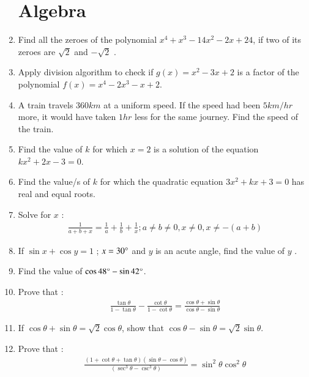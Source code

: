 \documentclass[2pt,-letter paper]{article}
\providecommand{\brak}[1]{\ensuremath{\left(#1\right)}}
\begin{document}
\begin{enumerate}
\section{Algebra}

\item Find all the zeroes of the polynomial $x^4 + x^3- 14x^2 -2x + 24$, if two of its zeroes are $\sqrt2$ and $-\sqrt 2$ .

\item Apply division algorithm to check if $g\brak{x} = x^2 - 3x + 2$ is a factor of the polynomial $f\brak{x} = x^4 - 2x^3 - x + 2$.


\item A train travels $360 km$ at a uniform speed. If the speed had been $5 km/hr$ more, it would have taken $1 hr$ less for the same journey. Find the speed of the train.

\item Find the value of $k$ for which $x = 2$ is a solution of the equation
  $kx^2 + 2x - 3 = 0$.
  
\item Find the value/s of $k$ for which the quadratic equation $3x^{2} + kx + 3 = 0$
has real and equal roots.


\item Solve for $x$ :
\begin{align*}
    {\frac {1}{a+b+x}} = {\frac{1}{a}} + {\frac{1}{b}} + {\frac{1}{x}};  {a\neq b \neq 0},{x \neq 0},{x \neq -(a+b)}
\end{align*}

\item If $\sin{x} + \cos{y}= 1$ ; $x=30\degree$  and  $y$ is an acute angle, find the value of $y$ .

\item Find the value of $\cos {48\degree} - \sin {42\degree}$.

\item Prove that :
\begin{align*}
   {\frac{\tan\theta}{1-\tan\theta}} - {\frac{\cot\theta}{1-\cot\theta}}={\frac{\cos\theta+ \sin\theta}{\cos\theta-\sin\theta}}
\end{align*} 

\item If ${\cos\theta + \sin\theta} = {\sqrt 2}{\cos\theta}$, show that ${\cos\theta - \sin\theta} = {\sqrt 2}{\sin\theta}$.

\item Prove that :
\begin{align*}
    {\frac{(1+\cot\theta+\tan\theta)(\sin\theta-\cos\theta)}{(\sec^3\theta-\csc^3\theta)}} = \sin^2\theta \cos^2\theta
\end{align*}


\end{enumerate}
\end{document}
